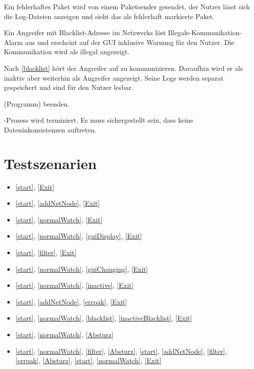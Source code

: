 \begin{description}[style=multiline, leftmargin=4cm, labelwidth=4cm]
  \item[\namedlabel{errpak}{Fehlerhaftes Paket}] Ein fehlerhaftes Paket wird von einem Paketsender gesendet, der Nutzer lässt sich die Log-Dateien anzeigen und sieht das als fehlerhaft markierte Paket.
  \item[\namedlabel{blacklist}{Blacklist}] Ein Angreifer mit Blacklist-Adresse im Netzwerks löst Illegale-Kommunikation-Alarm aus und erscheint auf der GUI inklusive Warnung für den Nutzer. Die Kommunikation wird als illegal angezeigt.
  \item[\namedlabel{inactiveBlacklist}{Inaktiver geblacklisteter Teilnehmer}] Nach \ref{blacklist} hört der Angreifer auf zu kommunizieren. Daraufhin wird er als inaktiv aber weiterhin als Angreifer angezeigt. Seine Logs werden separat gespeichert und sind für den Nutzer lesbar.
  \item[\namedlabel{Exit}{Exit}] \programname (Programm) beenden.
  \item[\namedlabel{Absturz}{Absturz}] \programname-Prozess wird terminiert. Es muss sichergestellt sein, dass keine Dateninkonsistenzen auftreten.
\end{description}

\section{Testszenarien}

\begin{itemize}
  \item \ref{start}, \ref{Exit}
  \item \ref{start}, \ref{addNetNode}, \ref{Exit}
  \item \ref{start}, \ref{normalWatch}, \ref{Exit}
  \item \ref{start}, \ref{normalWatch}, \ref{guiDisplay}, \ref{Exit}
  \item \ref{start}, \ref{filter}, \ref{Exit}
  \item \ref{start}, \ref{normalWatch}, \ref{guiChanging}, \ref{Exit}
  \item \ref{start}, \ref{normalWatch}, \ref{inactive}, \ref{Exit}
  \item \ref{start}, \ref{addNetNode}, \ref{errpak}, \ref{Exit}
  \item \ref{start}, \ref{normalWatch}, \ref{blacklist}, \ref{inactiveBlacklist}, \ref{Exit}
  \item \ref{start}, \ref{normalWatch}, \ref{Absturz}
  \item \ref{start}, \ref{normalWatch}, \ref{filter}, \ref{Absturz}, \ref{start}, \ref{addNetNode}, \ref{filter}, \ref{errpak}, \ref{Absturz}, \ref{start}, \ref{normalWatch}, \ref{Exit}
\end{itemize} 